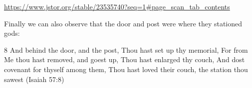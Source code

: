 \documentclass[11pt]{article}
\begin{document}
\url{https://www.jstor.org/stable/23535740?seq=1#page_scan_tab_contents}







Finally we can also observe that the door and post were where they stationed gods:

8 And behind the door, and the post, Thou hast set up thy memorial, For from Me thou hast removed, and goest up, Thou hast enlarged thy couch, And dost covenant for thyself among them, Thou hast loved their couch, the station thou sawest (Isaiah 57:8)
\end{document}
